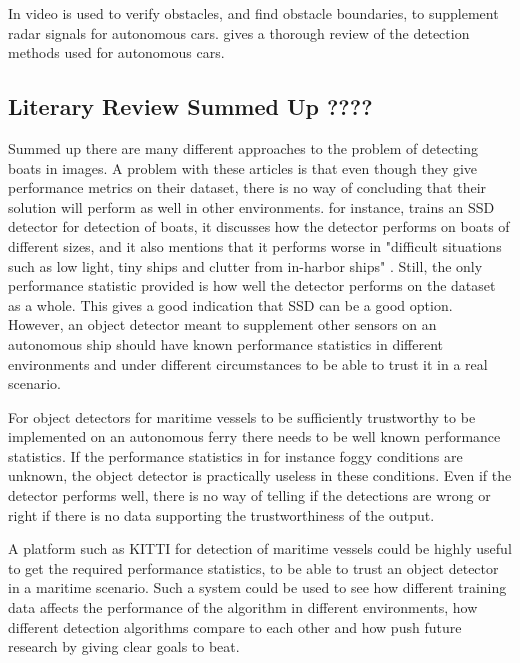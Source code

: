 \vspace{3mm}

In \citep{Wedel2007} video is used to verify obstacles, and find obstacle boundaries, to supplement radar signals for autonomous cars.\citep{Sun2006} gives a thorough review of the detection methods used for autonomous cars. 


\subsection{Literary Review Summed Up ????}
Summed up there are many different approaches to the problem of detecting boats in images. A problem with these articles is that even though they give performance metrics on their dataset, there is no way of concluding that their solution will perform as well in other environments. \citep{SSD_detection2018} for instance, trains an SSD detector for detection of boats, it discusses how the detector performs on boats of different sizes, and it also mentions that it performs worse in "difficult situations such as low light, tiny ships and clutter from in-harbor ships" \citep{SSD_detection2018}. Still, the only performance statistic provided is how well the detector performs on the dataset as a whole. This gives a good indication that SSD can be a good option. However, an object detector meant to supplement other sensors on an autonomous ship should have known performance statistics in different environments and under different circumstances to be able to trust it in a real scenario. 

\vspace{3mm}

For object detectors for maritime vessels to be sufficiently trustworthy to be implemented on an autonomous ferry there needs to be well known performance statistics. If the performance statistics in for instance foggy conditions are unknown, the object detector is practically useless in these conditions. Even if the detector performs well, there is no way of telling if the detections are wrong or right if there is no data supporting the trustworthiness of the output.

\vspace{3mm}

A platform such as KITTI \citep{KITTI} for detection of maritime vessels could be highly useful to get the required performance statistics, to be able to trust an object detector in a maritime scenario. Such a system could be used to see how different training data affects the performance of the algorithm in different environments, how different detection algorithms compare to each other and how push future research by giving clear goals to beat. 

